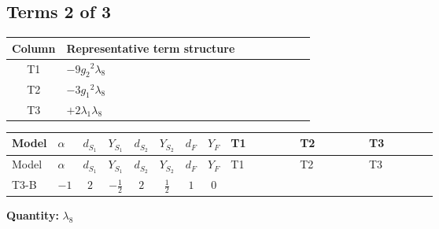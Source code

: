\documentclass[8pt]{article}
\begin{document}
\begin{landscape}
\subsection*{Terms 2 of 3}
\begin{center}
\begin{tabular}{@{}c >{\raggedright\arraybackslash}p{0.82\linewidth}@{}}
\toprule
Column & Representative term structure \\
\midrule
T1 & \(\displaystyle -9 {g_2}^2 {\lambda_8}\) \\
\midrule
T2 & \(\displaystyle -3 {g_1}^2 {\lambda_8}\) \\
\midrule
T3 & \(\displaystyle +2 {\lambda_1} {\lambda_8}\) \\
\midrule
\bottomrule
\end{tabular}
\end{center}
\smallskip
\tiny
\begin{longtable}{@{}llcccccc >{\raggedright\arraybackslash}p{0.21\linewidth} >{\raggedright\arraybackslash}p{0.21\linewidth} >{\raggedright\arraybackslash}p{0.21\linewidth}@{}}
\toprule
Model & $\alpha$ & $d_{S_1}$ & $Y_{S_1}$ & $d_{S_2}$ & $Y_{S_2}$ & $d_F$ & $Y_F$ & T1 & T2 & T3 \\
\midrule
\endfirsthead
\toprule
Model & $\alpha$ & $d_{S_1}$ & $Y_{S_1}$ & $d_{S_2}$ & $Y_{S_2}$ & $d_F$ & $Y_F$ & T1 & T2 & T3 \\
\midrule
\endhead
T3-B & $-1$ & $2$ & $-\frac{1}{2}$ & $2$ & $\frac{1}{2}$ & $1$ & $0$ & \scriptsize\adjustbox{max width=\linewidth}{$\begin{gathered} -9 {g_2}^2 {\lambda_8}\end{gathered}$} & \scriptsize\adjustbox{max width=\linewidth}{$\begin{gathered} -3 {g_1}^2 {\lambda_8}\end{gathered}$} & \scriptsize\adjustbox{max width=\linewidth}{$\begin{gathered} +2 {\lambda_1} {\lambda_8}\end{gathered}$} \\
\midrule
\bottomrule
\end{longtable}
\clearpage
\noindent\textbf{Quantity: }$\lambda_{8}$\par\smallskip

\end{landscape}
\end{document}
